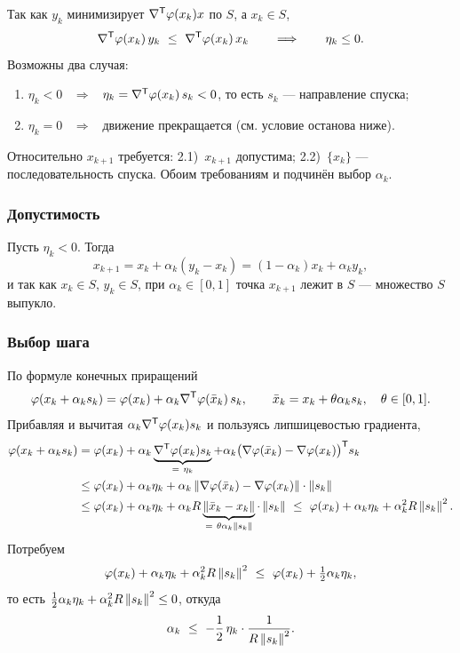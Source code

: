 
Так как $y_k$ минимизирует $\nabla^{\mathsf{T}}\varphi(x_k)x$ по $S$, а $x_k \in S$,
\[
  \nabla\T\varphi(x_k)\, y_k \ \le\ \nabla\T\varphi(x_k)\, x_k
  \qquad\Longrightarrow\qquad
  \eta_k \le 0 .
\]
Возможны два случая:
\begin{enumerate}[label=\arabic*),left=0pt]
  \item $\eta_k < 0$ \ $\Longrightarrow$ \
        $\eta_k = \nabla^{\mathsf{T}}\varphi(x_k)\, s_k < 0$, то есть $s_k$ — направление
        спуска;
  \item $\eta_k = 0$ \ $\Longrightarrow$ \ движение прекращается (см. условие
        останова ниже).
\end{enumerate}
Относительно $x_{k+1}$ требуется: 2.1)~$x_{k+1}$ допустима; 2.2)~$\{x_k\}$ —
последовательность спуска. Обоим требованиям и подчинён выбор $\alpha_k$.

\subsubsection*{Допустимость}

Пусть $\eta_k < 0$. Тогда
\[
  x_{k+1} = x_k + \alpha_k (y_k - x_k) = (1 - \alpha_k) x_k + \alpha_k y_k ,
\]
и так как $x_k \in S$, $y_k \in S$, при $\alpha_k \in [0,1]$ точка $x_{k+1}$
лежит в $S$ — множество $S$ выпукло.

\subsubsection*{Выбор шага}

По формуле конечных приращений
\[
  \varphi(x_k + \alpha_k s_k)
  = \varphi(x_k) + \alpha_k \nabla^{\mathsf{T}}\varphi(\bar{x}_k)\, s_k ,
  \qquad
  \bar{x}_k = x_k + \theta \alpha_k s_k , \quad \theta \in [0,1] .
\]
Прибавляя и вычитая $\alpha_k \nabla^{\mathsf{T}}\varphi(x_k) s_k$ и пользуясь
липшицевостью градиента,
\begin{align*}
  \varphi(x_k + \alpha_k s_k)
  &= \varphi(x_k) + \alpha_k \underbrace{\nabla\T\varphi(x_k) s_k}_{=\ \eta_k}
     + \alpha_k \big(\nabla\varphi(\bar{x}_k) - \nabla\varphi(x_k)\big)\T s_k \\
  &\le \varphi(x_k) + \alpha_k \eta_k
     + \alpha_k \norm{\nabla\varphi(\bar{x}_k) - \nabla\varphi(x_k)}
       \cdot \norm{s_k} \\
  &\le \varphi(x_k) + \alpha_k \eta_k
     + \alpha_k R \underbrace{\norm{\bar{x}_k - x_k}}_{=\ \theta\alpha_k\norm{s_k}}
       \cdot \norm{s_k}
   \ \le\ \varphi(x_k) + \alpha_k \eta_k + \alpha_k^2 R \norm{s_k}^2 .
\end{align*}
Потребуем
\begin{equation}\label{eq:fw-req}
  \varphi(x_k) + \alpha_k \eta_k + \alpha_k^2 R \left\lVert s_k \right\rVert^2
  \ \le\ \varphi(x_k) + \tfrac12 \alpha_k \eta_k ,
\end{equation}
то есть $\tfrac12 \alpha_k \eta_k + \alpha_k^2 R \left\lVert s_k \right\rVert^2 \le 0$, откуда
\begin{equation}\label{eq:fw-alpha}
  \alpha_k \ \le\ -\frac{1}{2}\, \eta_k \cdot \frac{1}{R \left\lVert s_k \right\rVert^2} .
\end{equation}

